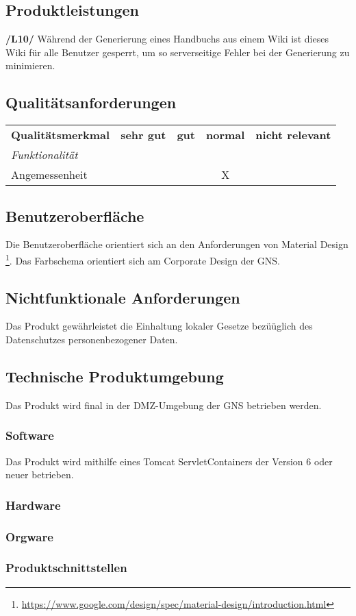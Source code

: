 \subsection*{Produktleistungen}
	\textbf{/L10/}
		Während der Generierung eines Handbuchs aus einem Wiki ist dieses Wiki für alle Benutzer gesperrt, um so serverseitige Fehler bei der Generierung zu minimieren.


\subsection*{Qualitätsanforderungen}
	\begin{table}[!ht]
		\centering
		\begin{tabular}{l|c|c|c|c}
			\rowcolor{gray!15}
			\textbf{Qualitätsmerkmal}	& \textbf{sehr gut}	& \textbf{gut}	& \textbf{normal}	& \textbf{nicht relevant}	\\
			\textit{Funktionalität} 	&					&				&					&							\\
			Angemessenheit				&					&				& X					&

		\end{tabular}
	\end{table}

\subsection*{Benutzeroberfläche}
	Die Benutzeroberfläche orientiert sich an den Anforderungen von Material Design
	\footnote{\url{https://www.google.com/design/spec/material-design/introduction.html}}.
	Das Farbschema orientiert sich am Corporate Design der GNS.


\subsection*{Nichtfunktionale Anforderungen}
	Das Produkt gewährleistet die Einhaltung lokaler Gesetze bezüüglich des Datenschutzes personenbezogener Daten.

\subsection*{Technische Produktumgebung}

	Das Produkt wird final in der DMZ-Umgebung der GNS betrieben werden.

	\subsubsection*{Software}
		Das Produkt wird mithilfe eines Tomcat ServletContainers der Version 6 oder neuer betrieben.

	\subsubsection*{Hardware}

	\subsubsection*{Orgware}

	\subsubsection*{Produktschnittstellen}

